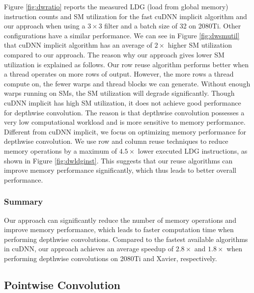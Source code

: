 Figure \ref{fig:dwratio} reports the measured LDG (load from global memory) instruction counts and SM utilization for the fast cuDNN implicit algorithm and our approach when using a $3 \times 3$ filter and a batch size of 32 on 2080Ti. Other configurations have a similar performance. 
We can see in Figure \ref{fig:dwsmutil} that cuDNN implicit algorithm has an average of $2\times$ higher SM utilization compared to our approach.
The reason why our approach gives lower SM utilization is explained as follows. 
Our row reuse algorithm performs better when a thread operates on more rows of output.
However, the more rows a thread compute on, the fewer warps and thread blocks we can generate. Without enough warps running on SMs, the SM utilization will degrade significantly.
Though cuDNN implicit has high SM utilization, it does not achieve good performance for depthwise convolution. 
The reason is that depthwise convolution possesses a very low computational workload and is more sensitive to memory performance.
Different from cuDNN implicit, we focus on optimizing memory performance for depthwise convolution. We use row and column reuse techniques to reduce memory operations by a maximum of $4.5\times$ lower executed LDG instructions, as shown in Figure \ref{fig:dwldginst}.
This suggests that our reuse algorithms can improve memory performance significantly, which thus leads to better overall performance.

\subsubsection{Summary}
Our approach can significantly reduce the number of memory operations and improve memory performance, which leads to faster computation time when performing depthwise convolutions.  
Compared to the fastest available algorithms in cuDNN, our approach achieves an average speedup of $2.8\times$ and $1.8\times$ when performing depthwise convolutions on 2080Ti and Xavier, respectively.


\subsection{Pointwise Convolution}
\label{sec:pwconvexp}

